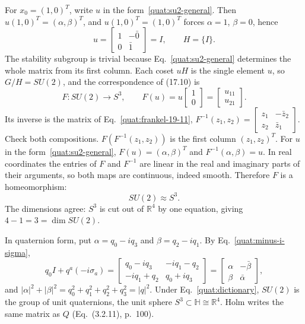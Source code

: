 For $x_0=(1,0)^T$, write $u$ in the form~\eqref{quat:su2-general}. Then
$u(1,0)^T=(\alpha,\beta)^T$, and $u(1,0)^T=(1,0)^T$ forces $\alpha=1$,
$\beta=0$, hence
\begin{equation}
 u=\begin{bmatrix}1&-\bar0\\0&\bar1\end{bmatrix}=I,\qquad H=\{I\}.
\end{equation}
The stability subgroup is trivial because Eq.~\eqref{quat:su2-general}
determines the whole matrix from its first column. Each coset $uH$ is the
single element $u$, so $G/H=SU(2)$, and the correspondence of (17.10) is
\begin{equation}\label{quat:first-column}
 F\colon SU(2)\to S^3,\qquad F(u)=u\begin{bmatrix}1\\0\end{bmatrix}
 =\begin{bmatrix}u_{11}\\u_{21}\end{bmatrix}.
\end{equation}
Its inverse is the matrix of Eq.~\eqref{quat:frankel-19-11},
$F^{-1}(z_1,z_2)=\begin{bmatrix}z_1&-\bar z_2\\z_2&\bar z_1\end{bmatrix}$.
Check both compositions. $F(F^{-1}(z_1,z_2))$ is the first column
$(z_1,z_2)^T$. For $u$ in the form~\eqref{quat:su2-general},
$F(u)=(\alpha,\beta)^T$ and $F^{-1}(\alpha,\beta)=u$. In real coordinates the
entries of $F$ and $F^{-1}$ are linear in the real and imaginary parts of
their arguments, so both maps are continuous, indeed smooth. Therefore $F$ is
a homeomorphism:
\begin{equation}
 SU(2)\approx S^3 .
\end{equation}
The dimensions agree: $S^3$ is cut out of $\mathbb R^4$ by one equation,
giving $4-1=3=\dim SU(2)$.

In quaternion form, put $\alpha=q_0-iq_3$ and $\beta=q_2-iq_1$. By
Eq.~\eqref{quat:minus-i-sigma},
\begin{equation}
 q_0I+q^a(-i\sigma_a)
 =\begin{bmatrix}q_0-iq_3&-iq_1-q_2\\-iq_1+q_2&q_0+iq_3\end{bmatrix}
 =\begin{bmatrix}\alpha&-\bar\beta\\ \beta&\bar\alpha\end{bmatrix},
\end{equation}
and $|\alpha|^2+|\beta|^2=q_0^2+q_1^2+q_2^2+q_3^2=|q|^2$. Under
Eq.~\eqref{quat:dictionary}, $SU(2)$ is the group of unit quaternions, the
unit sphere $S^3\subset\mathbb H\cong\mathbb R^4$. Holm writes the same
matrix as $Q$ (Eq.~(3.2.11), p.~100).

